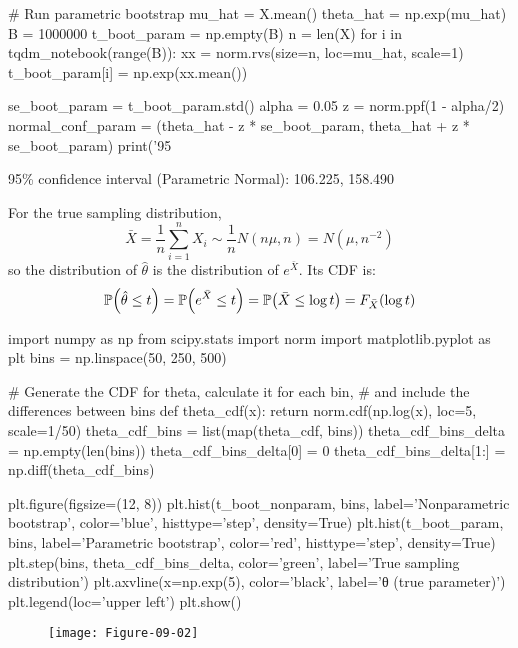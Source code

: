 \begin{python}
# Run parametric bootstrap
mu_hat = X.mean()
theta_hat = np.exp(mu_hat)
B = 1000000
t_boot_param = np.empty(B)
n = len(X)
for i in tqdm_notebook(range(B)):
    xx = norm.rvs(size=n, loc=mu_hat, scale=1)
    t_boot_param[i] = np.exp(xx.mean())
    
se_boot_param = t_boot_param.std()
alpha = 0.05
z = norm.ppf(1 - alpha/2)
normal_conf_param = (theta_hat - z * se_boot_param, theta_hat + z * se_boot_param)
print('95%
\end{python}
\begin{console}
95\% confidence interval (Parametric Normal):     106.225, 158.490
\end{console}
For the true sampling distribution,
\[
\bar{X} 
= \frac{1}{n} \sum_{i=1}^{n} X_{i} \sim \frac{1}{n} N(n \mu, n) 
= N(\mu, n^{-2})
\]
so the distribution of \(\hat{\theta}\) is the distribution of
\(e^{\bar{X}}\). Its CDF is:
\[
\PROB\left(\hat{\theta} \leq t\right) 
= \PROB\left(e^{\bar{X}} \leq t\right) 
= \PROB\left(\bar{X} \leq \log t\right) 
= F_{\bar{X}}\left(\log t\right)
\]

\begin{python}
import numpy as np
from scipy.stats import norm
import matplotlib.pyplot as plt
bins = np.linspace(50, 250, 500)
\end{python}

\begin{python}
# Generate the CDF for theta, calculate it for each bin, 
# and include the differences between bins
def theta_cdf(x):
    return norm.cdf(np.log(x), loc=5, scale=1/50)
theta_cdf_bins = list(map(theta_cdf, bins))
theta_cdf_bins_delta = np.empty(len(bins))
theta_cdf_bins_delta[0] = 0
theta_cdf_bins_delta[1:] = np.diff(theta_cdf_bins)
\end{python}

\begin{python}
plt.figure(figsize=(12, 8))
plt.hist(t_boot_nonparam, bins, label='Nonparametric bootstrap', color='blue', 
         histtype='step', density=True)
plt.hist(t_boot_param, bins, label='Parametric bootstrap', color='red', 
         histtype='step', density=True)
plt.step(bins, theta_cdf_bins_delta, color='green', label='True sampling distribution')
plt.axvline(x=np.exp(5), color='black', label='θ (true parameter)')
plt.legend(loc='upper left')
plt.show()
\end{python}

\begin{figure}[H]
\centering
\texttt{[image: Figure-09-02]}
\end{figure}


